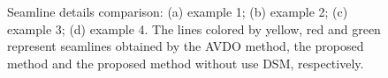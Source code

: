 \documentclass[journal]{IEEEtran}
\begin{document}
\begin{figure}[!t]
    \caption{Seamline details comparison: (a) example 1; (b) example 2; (c) example 3; (d) example 4. The lines colored by yellow, red and green represent seamlines obtained by the AVDO method, the proposed method and the proposed method without use DSM, respectively.}
    \label{fig:seamline-details-comparison}
\end{figure}
\end{document}
